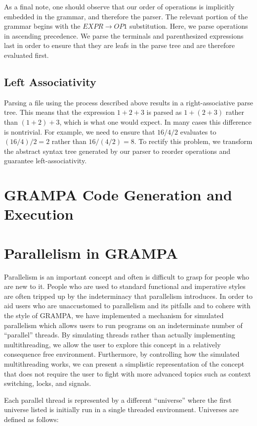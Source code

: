\documentclass[preprint]{sigplanconf}
\begin{document}
As a final note, one should observe that our order of operations is implicitly embedded in the grammar, and therefore the parser. The relevant portion of the grammar begins with the $EXPR \rightarrow OP1$ substitution. Here, we parse operations in ascending precedence. We parse the terminals and parenthesized expressions last in order to ensure that they are leafs in the parse tree and are therefore evaluated first. 

\subsection{Left Associativity}
Parsing a file using the process described above results in a right-associative parse tree. This means that the expression $1 + 2 + 3$ is parsed as $1 + (2 + 3)$ rather than $(1 + 2) + 3$, which is what one would expect. In many cases this difference is nontrivial. For example, we need to ensure that $16 / 4 / 2$ evaluates to $(16 / 4) / 2 = 2$ rather than $16 / (4 / 2) = 8$. To rectify this problem, we transform the abstract syntax tree generated by our parser to reorder operations and guarantee left-associativity. 

\section{GRAMPA Code Generation and Execution}

\section{Parallelism in GRAMPA}
Parallelism is an important concept and often is difficult to grasp for people who are new to it. People who are used to standard functional and imperative styles are often tripped up by the indeterminacy that parallelism introduces. In order to aid users who are unaccustomed to parallelism and its pitfalls and to cohere with the style of GRAMPA, we have implemented a mechanism for simulated parallelism which allows users to run programs on an indeterminate number of “parallel” threads. By simulating threads rather than actually implementing multithreading, we allow the user to explore this concept in a relatively consequence free environment. Furthermore, by controlling how the simulated multithreading works, we can present a simplistic representation of the concept that does not require the user to fight with more advanced topics such as context switching, locks, and signals.
	
Each parallel thread is represented by a different “universe” where the first universe listed is initially run in a single threaded environment. Universes are defined as follows:
\end{document}
